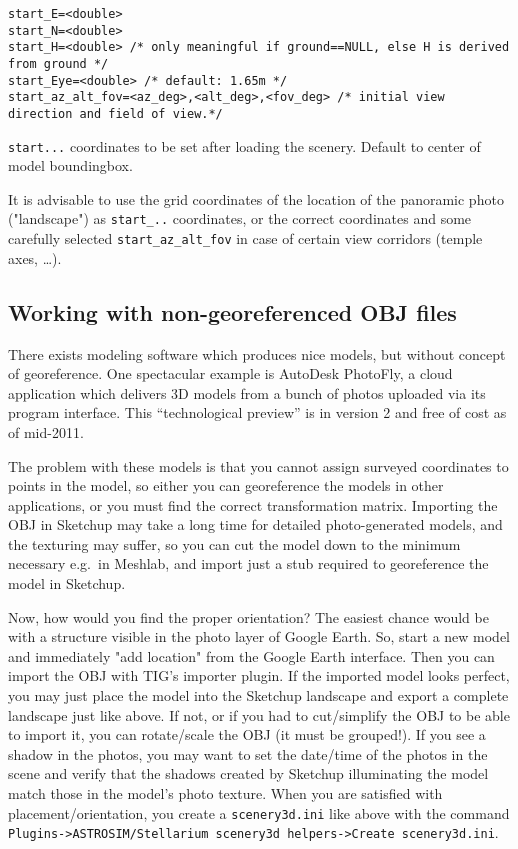 \documentclass[a4paper]{article}
\newcommand{\filename}[1]{\texttt{#1}}
\newcommand{\cmd}[1]{\texttt{#1}}
\begin{document}
\begin{verbatim}
start_E=<double> 
start_N=<double> 
start_H=<double> /* only meaningful if ground==NULL, else H is derived from ground */
start_Eye=<double> /* default: 1.65m */
start_az_alt_fov=<az_deg>,<alt_deg>,<fov_deg> /* initial view direction and field of view.*/
\end{verbatim}
\verb|start...| coordinates to be set after loading the scenery. Default to center of model boundingbox. 

It is advisable to use the grid coordinates of the location of the panoramic photo ("landscape") as \verb|start_..| coordinates, 
or the correct coordinates and some carefully selected \texttt{start\_az\_alt\_fov} in case of certain view corridors (temple axes, \ldots).


\subsection{Working with non-georeferenced OBJ files}
\label{sec:NonGeoreferenced}


There exists modeling software which produces nice models, but without
concept of georeference. One spectacular example is AutoDesk PhotoFly,
a cloud application which delivers 3D models from a bunch of photos
uploaded via its program interface. This ``technological preview'' is
in version 2 and free of cost as of mid-2011.

The problem with these models is that you cannot assign surveyed
coordinates to points in the model, so either you can georeference the
models in other applications, or you must find the correct
transformation matrix.  Importing the OBJ in Sketchup may take a long
time for detailed photo-generated models, and the texturing may
suffer, so you can cut the model down to the minimum necessary e.g.\ in
Meshlab, and import just a stub required to georeference the model in
Sketchup. 

Now, how would you find the proper orientation? The easiest chance
would be with a structure visible in the photo layer of Google
Earth. So, start a new model and immediately "add location" from the
Google Earth interface. Then you can import the OBJ with TIG's importer
plugin.  If the imported model looks perfect, you may just place the
model into the Sketchup landscape and export a complete landscape just
like above. If not, or if you had to cut/simplify the OBJ to be able
to import it, you can rotate/scale the OBJ (it must be grouped!). If
you see a shadow in the photos, you may want to set the date/time of
the photos in the scene and verify that the shadows created by
Sketchup illuminating the model match those in the model's photo
texture. When you are satisfied with placement/orientation, you create
a \filename{scenery3d.ini} like above with the command
\cmd{Plugins->ASTROSIM/Stellarium scenery3d helpers->Create scenery3d.ini}.
\end{document}
